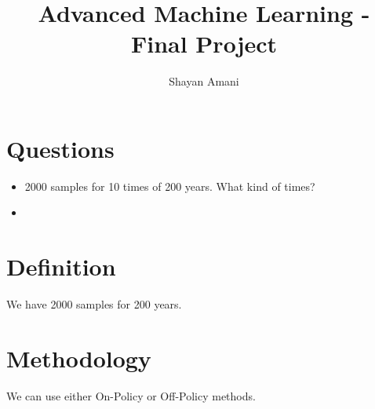 \documentclass[a4paper,12pt]{article}
\title{Advanced Machine Learning - Final Project}
\author{Shayan Amani}
\begin{document}
\maketitle

\section{Questions}
\begin{itemize}
    \item 2000 samples for 10 times of 200 years. What kind of times?
    \item 
\end{itemize}

\section{Definition}
We have 2000 samples for 200 years.

\section{Methodology}
We can use either On-Policy or Off-Policy methods.
\end{document}
